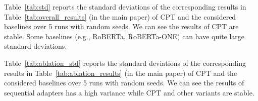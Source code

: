\documentclass[11pt]{article}
\begin{document}
Table~\ref{tab:std} reports the standard deviations of the corresponding results in Table~\ref{tab:overall_results} (in the main paper) of CPT and the considered baselines over 5 runs with random seeds. We can see the results of CPT are stable. Some baselines (e.g., RoBERTa, RoBERTa-ONE) can have quite large standard deviations. 

Table~\ref{tab:ablation_std} reports the standard deviations of the corresponding results in Table~\ref{tab:ablation_results} (in the main paper) of CPT and the considered baselines over 5 runs with random seeds. We can see the results of sequential adapters has a high variance while CPT and other variants are stable. 
\end{document}
